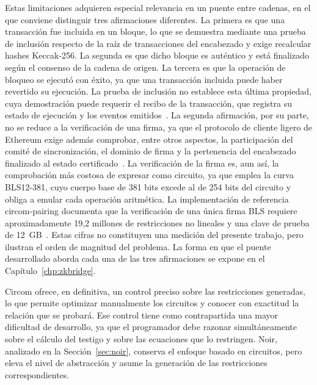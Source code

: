 Estas limitaciones adquieren especial relevancia en un puente entre cadenas, en el que conviene
distinguir tres afirmaciones diferentes. La primera es que una transacción fue incluida en un
bloque, lo que se demuestra mediante una prueba de inclusión respecto de la raíz de
transacciones del encabezado y exige recalcular hashes Keccak-256. La segunda es que dicho bloque
es auténtico y está finalizado según el consenso de la cadena de origen. La tercera es que la
operación de bloqueo se ejecutó con éxito, ya que una transacción incluida puede haber revertido
su ejecución. La prueba de inclusión no establece esta última propiedad, cuya demostración puede
requerir el recibo de la transacción, que registra su estado de ejecución y los eventos
emitidos~\cite{wood2014ethereum, eip658}. La segunda afirmación, por su parte, no se reduce a la
verificación de una firma, ya que el protocolo de cliente ligero de Ethereum exige además
comprobar, entre otros aspectos, la participación del comité de sincronización, el dominio de
firma y la pertenencia del encabezado finalizado al estado certificado~\cite{ethlightclient,
ethlightclientcapella}. La verificación de la firma es, aun así, la
comprobación más costosa de expresar como circuito, ya que emplea la curva BLS12-381, cuyo cuerpo
base de 381 bits excede al de 254 bits del circuito y obliga a emular cada operación aritmética.
La implementación de referencia circom-pairing documenta que la verificación de una única firma
BLS requiere aproximadamente 19,2 millones de restricciones no lineales y una clave de prueba de
12~GB~\cite{circompairing}. Estas cifras no constituyen una medición del presente trabajo, pero
ilustran el orden de magnitud del problema. La forma en que el puente desarrollado aborda cada
una de las tres afirmaciones se expone en el Capítulo~\ref{chp:zkbridge}.

Circom ofrece, en definitiva, un control preciso sobre las restricciones generadas, lo que
permite optimizar manualmente los circuitos y conocer con exactitud la relación que se probará.
Ese control tiene como contrapartida una mayor dificultad de desarrollo, ya que el programador
debe razonar simultáneamente sobre el cálculo del testigo y sobre las ecuaciones que lo
restringen. Noir, analizado en la Sección~\ref{sec:noir}, conserva el enfoque basado en
circuitos, pero eleva el nivel de abstracción y asume la generación de las restricciones
correspondientes.
